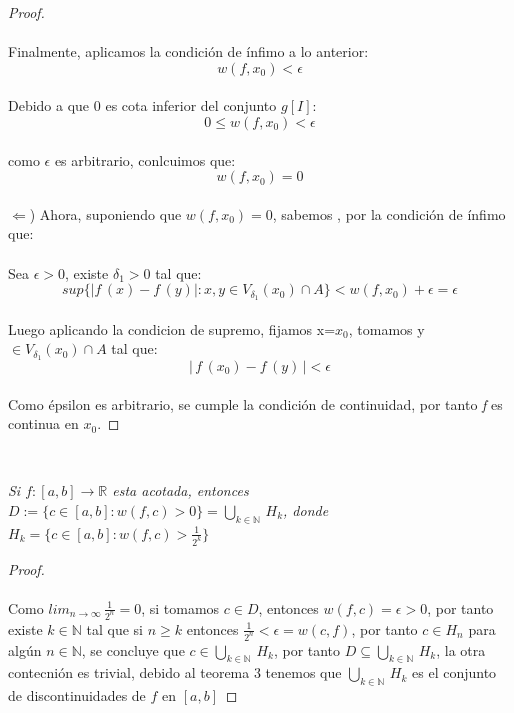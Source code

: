 \documentclass[11pt,letterpaper]{article}
\newcommand{\R}{\mathbb{R}}
\newcommand{\N}{\mathbb{N}}
\begin{document}
\begin{proof}
\begin{equation*}
\end{equation*}\\
Finalmente, aplicamos la condici\'on de \'infimo a lo anterior:\\
\begin{equation*}
    w(f,x_0)<\epsilon
\end{equation*}\\
Debido a que 0 es cota inferior del conjunto $g[I]$:\\
\begin{equation*}
    0\leq w(f,x_0)<\epsilon
\end{equation*}\\
como $\epsilon$ es arbitrario, conlcuimos que:\\
\begin{equation*}
    w(f,x_0)=0
\end{equation*}\\
$\Longleftarrow$) Ahora, suponiendo que $w(f,x_0)=0$, sabemos , por la condici\'on de \'infimo que:\\
\,\\
Sea $\epsilon>0$, existe $\delta_1>0$ tal que:\\
\begin{equation*}
    sup \{ |\textit{f}\,(x)- \textit{f}\,(y)| :x,y \in V_{\delta_1} (x_0)\cap A\}<w(f,x_0) + \epsilon= \epsilon
\end{equation*}\\
Luego aplicando la condicion de supremo, fijamos x=$x_0$, tomamos y $\in V_{\delta_1}(x_0)\cap A$ tal que:\\
\begin{equation*}
    |\,\textit{f}\,(x_0)-\textit{f}\,(y)\,|<\epsilon
\end{equation*}\\
Como \'epsilon es arbitrario, se cumple la condici\'on de continuidad, por tanto \textit{f} es continua en $x_0$.
\end{proof}\,\\
\begin{tcolorbox}[
	title = \textcolor{black}{\textcolor{white}{Teorema 4}},]
\textit{Si $f:[a,b]\rightarrow\R$ esta acotada, entonces $D:=\{c\in [a,b]:w(f,c)>0\}=\bigcup_{k\in \N}\,H_k$, donde 
$H_k=\{c\in [a,b]:w(f,c)>\frac{1}{2^k}\}$}
\end{tcolorbox}
\begin{proof}\,\\
    \,\\
    Como $\displaystyle lim_{n\rightarrow \infty}\,\frac{1}{2^n}=0$, si tomamos $c\in D$, entonces $w(f,c)=\epsilon>0$, por tanto existe
    $k\in \N$ tal que si $n\geq k$ entonces $\frac{1}{2^n}<\epsilon=w(c,f)$, por tanto $c\in H_n$ para alg\'un $n\in \N$, se concluye que $c\in\bigcup_{k\in \N}\,H_k$, por tanto $D\subseteq \bigcup_{k\in \N}\,H_k$, la otra contecni\'on es trivial, debido
    al teorema $3$ tenemos que $\bigcup_{k\in \N}\,H_k$ es el conjunto de discontinuidades de $f$ en $[a,b]$
\end{proof}
\end{document}
